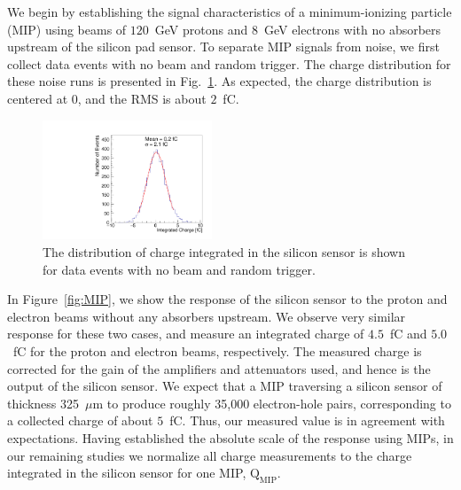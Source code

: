\documentclass[12pt]{article}
\begin{document}
{We begin by establishing the signal characteristics of a minimum-ionizing
particle (MIP) using beams of $120$~GeV protons and $8$~GeV electrons with no
absorbers upstream of the silicon pad sensor. To separate MIP signals from
noise, we first collect data events with no beam and random trigger. The charge
distribution for these noise runs is presented in Fig.~\ref{fig:noise}. As expected,
the charge distribution is centered at $0$, and the RMS is about
$2$~fC. 

\begin{figure}[htbp] 
\centering
\includegraphics[width=0.45\textwidth]{plots/NoiseNoBeam_charge.pdf} 
\caption{The distribution of charge integrated in the silicon sensor is shown for data events with no beam and random trigger. } 
\label{fig:noise} 
\end{figure} 

In Figure~\ref{fig:MIP}, we show the response of the silicon sensor to the
proton and electron beams without any absorbers upstream. We observe very
similar response for these two cases, and measure an integrated charge of
$4.5$~fC and $5.0$~fC for the proton and electron beams, respectively. The
measured charge is corrected for the gain of the amplifiers and attenuators
used, and hence is the output of the silicon sensor. We expect that a MIP traversing
a silicon sensor of thickness 325~$\mu$m to produce roughly 35,000 electron-hole
pairs, corresponding to a collected charge of about $5$~fC. Thus, our measured value is
in agreement with expectations. Having established the absolute scale of
the  response using MIPs, in our remaining studies we normalize all
charge measurements to the charge integrated in the silicon sensor for one MIP, 
$\mathrm{Q}_{\mathrm{MIP}}$. 

}
\end{document}
